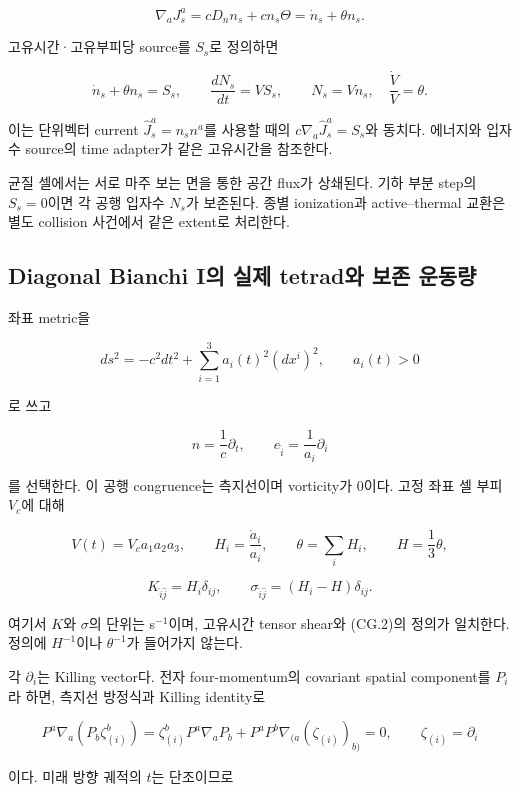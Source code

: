 \[
\nabla_aJ_s^a
=cD_nn_s+c n_s\Theta
=\dot n_s+\theta n_s.
\]

고유시간·고유부피당 source를 \(S_s\)로 정의하면

\[
\boxed{
\dot n_s+\theta n_s=S_s,\qquad
\frac{dN_s}{dt}=V S_s,\qquad N_s=Vn_s,\quad \frac{\dot V}{V}=\theta.
}
\tag{CG.3}
\]

이는 단위벡터 current \(\widehat J_s^a=n_s n^a\)를 사용할 때의 \(c\nabla_a\widehat J_s^a=S_s\)와 동치다. 에너지와 입자수 source의 time adapter가 같은 고유시간을 참조한다.

균질 셀에서는 서로 마주 보는 면을 통한 공간 flux가 상쇄된다. 기하 부분 step의 \(S_s=0\)이면 각 공행 입자수 \(N_s\)가 보존된다. 종별 ionization과 active--thermal 교환은 별도 collision 사건에서 같은 extent로 처리한다.

\hypertarget{diagonal-bianchi-iuxc758-uxc2e4uxc81c-tetraduxc640-uxbcf4uxc874-uxc6b4uxb3d9uxb7c9}{%
\subsection{Diagonal Bianchi I의 실제 tetrad와 보존 운동량}\label{diagonal-bianchi-iuxc758-uxc2e4uxc81c-tetraduxc640-uxbcf4uxc874-uxc6b4uxb3d9uxb7c9}}

좌표 metric을

\[
ds^2=-c^2dt^2+\sum_{i=1}^3a_i(t)^2(dx^i)^2,\qquad a_i(t)>0
\tag{CG.4}
\]

로 쓰고

\[
n=\frac1c\partial_t,\qquad
e_{\hat i}=\frac1{a_i}\partial_i
\]

를 선택한다. 이 공행 congruence는 측지선이며 vorticity가 0이다. 고정 좌표 셀 부피 \(V_c\)에 대해

\[
V(t)=V_c a_1a_2a_3,\qquad
H_i=\frac{\dot a_i}{a_i},\qquad
\theta=\sum_iH_i,\qquad H=\frac13\theta,
\]

\[
K_{\hat i\hat j}=H_i\delta_{ij},\qquad
\sigma_{\hat i\hat j}=(H_i-H)\delta_{ij}.
\]

여기서 \(K\)와 \(\sigma\)의 단위는 s\(^{-1}\)이며, 고유시간 tensor shear와 (CG.2)의 정의가 일치한다. 정의에 \(H^{-1}\)이나 \(\theta^{-1}\)가 들어가지 않는다.

각 \(\partial_i\)는 Killing vector다. 전자 four-momentum의 covariant spatial component를 \(P_i\)라 하면, 측지선 방정식과 Killing identity로

\[
P^a\nabla_a(P_b\zeta_{(i)}^b)
=\zeta_{(i)}^bP^a\nabla_aP_b
+P^aP^b\nabla_{(a}(\zeta_{(i)})_{b)}=0,
\qquad \zeta_{(i)}=\partial_i
\]

이다. 미래 방향 궤적의 \(t\)는 단조이므로

